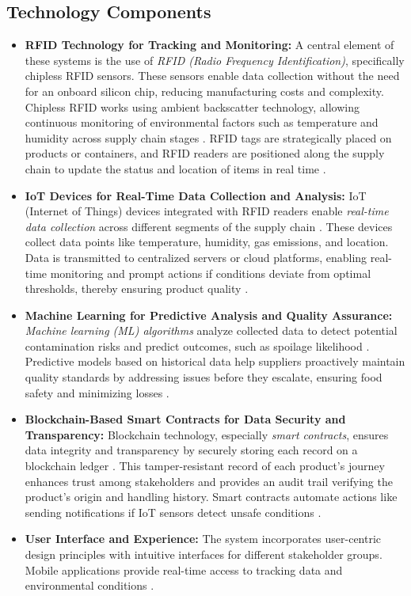 \documentclass[conference]{IEEEtran}
\begin{document}
\subsection{Technology Components}
\begin{itemize}
    \item \textbf{RFID Technology for Tracking and Monitoring:}
    A central element of these systems is the use of \textit{RFID (Radio Frequency Identification)}, specifically chipless RFID sensors. These sensors enable data collection without the need for an onboard silicon chip, reducing manufacturing costs and complexity. Chipless RFID works using ambient backscatter technology, allowing continuous monitoring of environmental factors such as temperature and humidity across supply chain stages \cite{rayhana2021rfid}. RFID tags are strategically placed on products or containers, and RFID readers are positioned along the supply chain to update the status and location of items in real time \cite{visconti2020development}.

    \item \textbf{IoT Devices for Real-Time Data Collection and Analysis:}
    IoT (Internet of Things) devices integrated with RFID readers enable \textit{real-time data collection} across different segments of the supply chain \cite{elbeheiry2023technologies}. These devices collect data points like temperature, humidity, gas emissions, and location. Data is transmitted to centralized servers or cloud platforms, enabling real-time monitoring and prompt actions if conditions deviate from optimal thresholds, thereby ensuring product quality \cite{makario2021bluetooth}.

    \item \textbf{Machine Learning for Predictive Analysis and Quality Assurance:}
    \textit{Machine learning (ML) algorithms} analyze collected data to detect potential contamination risks and predict outcomes, such as spoilage likelihood \cite{rosero2023smart}. Predictive models based on historical data help suppliers proactively maintain quality standards by addressing issues before they escalate, ensuring food safety and minimizing losses \cite{ahmed2024optimized}.

    \item \textbf{Blockchain-Based Smart Contracts for Data Security and Transparency:}
    Blockchain technology, especially \textit{smart contracts}, ensures data integrity and transparency by securely storing each record on a blockchain ledger \cite{xu2023novel}. This tamper-resistant record of each product's journey enhances trust among stakeholders and provides an audit trail verifying the product's origin and handling history. Smart contracts automate actions like sending notifications if IoT sensors detect unsafe conditions \cite{al2021prochain}.

    \item \textbf{User Interface and Experience:}
    The system incorporates user-centric design principles \cite{tharatipyakul2021user} with intuitive interfaces for different stakeholder groups. Mobile applications provide real-time access to tracking data and environmental conditions \cite{hernandez2024implementation}.
\end{itemize}
\end{document}
